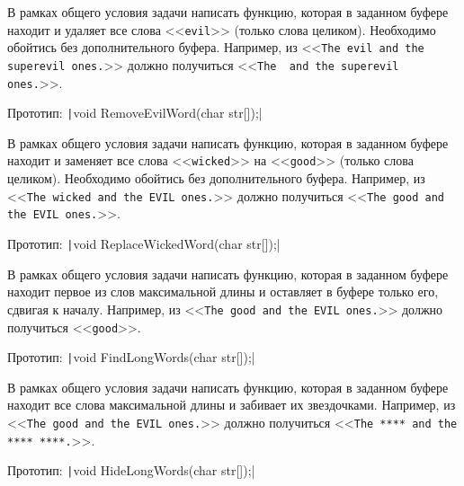 
\begin{zztask}
В рамках общего условия задачи написать функцию, которая в заданном буфере
находит и удаляет все слова <<\texttt{evil}>> (только слова целиком).
Необходимо обойтись без дополнительного буфера.
Например, из
<<\texttt{The evil and the superevil ones.}>>
должно получиться
<<\texttt{The \ and the superevil ones.}>>.

Прототип: \texttt|void RemoveEvilWord(char str[]);|
\end{zztask}


\begin{zztask}
В рамках общего условия задачи написать функцию, которая в заданном буфере
находит и заменяет все слова <<\texttt{wicked}>> на <<\texttt{good}>> (только слова целиком).
Необходимо обойтись без дополнительного буфера.
Например, из
<<\texttt{The wicked and the EVIL ones.}>>
должно получиться
<<\texttt{The good and the EVIL ones.}>>.

Прототип: \texttt|void ReplaceWickedWord(char str[]);|
\end{zztask}


\begin{zztask}
В рамках общего условия задачи написать функцию, которая в заданном буфере
находит первое из слов максимальной длины и оставляет в буфере только его,
сдвигая к началу.
Например, из
<<\texttt{The good and the EVIL ones.}>>
должно получиться
<<\texttt{good}>>.

Прототип: \texttt|void FindLongWords(char str[]);|
\end{zztask}


\begin{zztask}
В рамках общего условия задачи написать функцию, которая в заданном буфере
находит все слова максимальной длины и забивает их звездочками.
Например, из
<<\texttt{The good and the EVIL ones.}>>
должно получиться
<<\texttt{The **** and the **** ****.}>>.

Прототип: \texttt|void HideLongWords(char str[]);|
\end{zztask}

